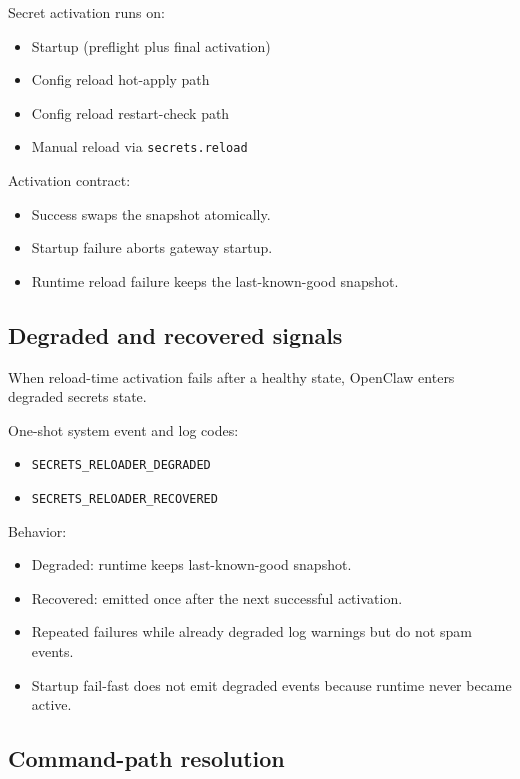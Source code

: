 Secret activation runs on:

\begin{itemize}
  \item Startup (preflight plus final activation)
  \item Config reload hot-apply path
  \item Config reload restart-check path
  \item Manual reload via \texttt{secrets.reload}
\end{itemize}


Activation contract:

\begin{itemize}
  \item Success swaps the snapshot atomically.
  \item Startup failure aborts gateway startup.
  \item Runtime reload failure keeps the last-known-good snapshot.
\end{itemize}


\subsection{Degraded and recovered signals}


When reload-time activation fails after a healthy state, OpenClaw enters degraded secrets state.

One-shot system event and log codes:

\begin{itemize}
  \item \texttt{SECRETS\_RELOADER\_DEGRADED}
  \item \texttt{SECRETS\_RELOADER\_RECOVERED}
\end{itemize}


Behavior:

\begin{itemize}
  \item Degraded: runtime keeps last-known-good snapshot.
  \item Recovered: emitted once after the next successful activation.
  \item Repeated failures while already degraded log warnings but do not spam events.
  \item Startup fail-fast does not emit degraded events because runtime never became active.
\end{itemize}


\subsection{Command-path resolution}


